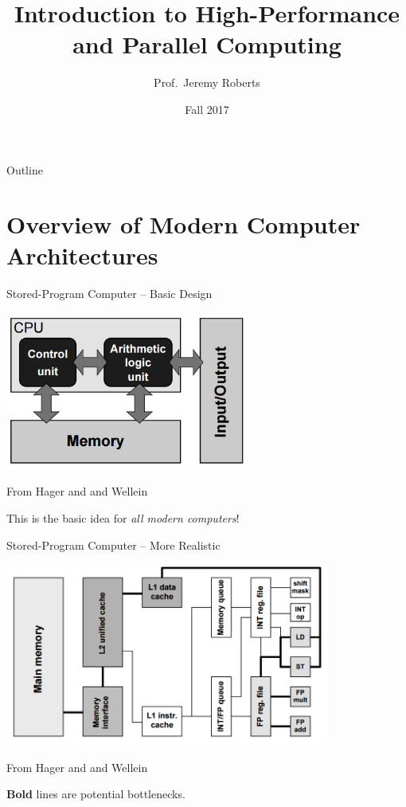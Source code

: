 \documentclass[10pt]{beamer}
\title %
[C++ and Fortran]{Introduction to High-Performance and Parallel Computing}
\author[Roberts]{Prof.~Jeremy Roberts}
\date
{Fall 2017}
\begin{document}
\begin{frame}[plain]
  \titlepage
\end{frame}

\begin{frame}{Outline}
  \tableofcontents
\end{frame}

\section{Overview of Modern Computer Architectures}

\begin{frame}{Stored-Program Computer -- Basic Design}

\includegraphics[width=0.6\textwidth]{stored_program_computer.png}

{\tiny From Hager and and Wellein}

\vfill

This is the basic idea for {\it all modern computers}!

\end{frame}


\begin{frame}{Stored-Program Computer -- More Realistic}

\includegraphics[width=0.8\textwidth]{cache_based_microprocessor.png}

{\tiny From Hager and and Wellein}
\vfill

{\bf Bold} lines are potential bottlenecks.

\end{frame}
\end{document}
